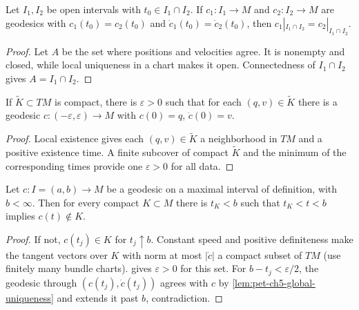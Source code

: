 \begin{lemma}
  \label{lem:pet-ch5-global-uniqueness}


  Let $I_1,I_2$ be open intervals with $t_0\in I_1\cap I_2$. If $c_1:I_1\to M$ and
  $c_2:I_2\to M$ are geodesics with $c_1(t_0)=c_2(t_0)$ and $\dot c_1(t_0)=\dot c_2(t_0)$,
  then $c_1|_{I_1\cap I_2}=c_2|_{I_1\cap I_2}$.
\end{lemma}
\begin{proof}
  \sketch
  Let $A$ be the set where positions and velocities agree.  It is nonempty and
  closed, while local uniqueness in a chart makes it open.  Connectedness of
  $I_1\cap I_2$ gives $A=I_1\cap I_2$.
\end{proof}

\begin{lemma}
  \label{lem:pet-ch5-uniform-time-existence}


  If $\tilde K\subset TM$ is compact, there is $\varepsilon>0$ such that for each
  $(q,v)\in\tilde K$ there is a geodesic $c:(-\varepsilon,\varepsilon)\to M$ with
  $c(0)=q$, $\dot c(0)=v$.
\end{lemma}
\begin{proof}
  \sketch
  Local existence gives each $(q,v)\in\tilde K$ a neighborhood in $TM$ and a
  positive existence time.  A finite subcover of compact $\tilde K$ and the
  minimum of the corresponding times provide one $\varepsilon>0$ for all data.
\end{proof}

\begin{proposition}
  \label{prop:pet-ch5-leaves-compact-set}


  Let $c:I=(a,b)\to M$ be a geodesic on a maximal interval of definition, with
  $b<\infty$. Then for every compact $K\subset M$ there is $t_K<b$ such that
  $t_K<t<b$ implies $c(t)\notin K$.
\end{proposition}
\begin{proof}
  \sketch
  If not, $c(t_j)\in K$ for $t_j\uparrow b$.  Constant speed and positive
  definiteness make the tangent vectors over $K$ with norm at most $|\dot c|$ a
  compact subset of $TM$ (use finitely many bundle charts).
   gives $\varepsilon>0$ for this set.
  For $b-t_j<\varepsilon/2$, the
  geodesic through $(c(t_j),\dot c(t_j))$ agrees with $c$ by
  \cref{lem:pet-ch5-global-uniqueness} and extends it past $b$, contradiction.
\end{proof}

